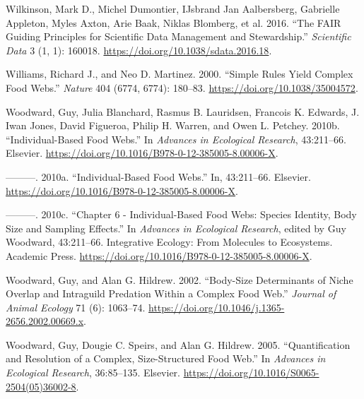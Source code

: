\documentclass{article}
\newlength{\cslhangindent}
\newlength{\cslentryspacingunit} %
\newenvironment{CSLReferences}[2] %
 {%
  \setlength{\parindent}{0pt}
  \ifodd #1
  \let\oldpar\par
  \def\par{\hangindent=\cslhangindent\oldpar}
  \fi
  \setlength{\parskip}{#2\cslentryspacingunit}
 }%
 {}
\begin{document}
\begin{CSLReferences}{1}{0}
\leavevmode{}%
Wilkinson, Mark D., Michel Dumontier, IJsbrand Jan Aalbersberg,
Gabrielle Appleton, Myles Axton, Arie Baak, Niklas Blomberg, et al.
2016. {``The {FAIR Guiding Principles} for Scientific Data Management
and Stewardship.''} \emph{Scientific Data} 3 (1, 1): 160018.
\url{https://doi.org/10.1038/sdata.2016.18}.

\leavevmode{}%
Williams, Richard J., and Neo D. Martinez. 2000. {``Simple Rules Yield
Complex Food Webs.''} \emph{Nature} 404 (6774, 6774): 180--83.
\url{https://doi.org/10.1038/35004572}.

\leavevmode{}%
Woodward, Guy, Julia Blanchard, Rasmus B. Lauridsen, Francois K.
Edwards, J. Iwan Jones, David Figueroa, Philip H. Warren, and Owen L.
Petchey. 2010b. {``Individual-{Based Food Webs}.''} In \emph{Advances in
{Ecological Research}}, 43:211--66. {Elsevier}.
\url{https://doi.org/10.1016/B978-0-12-385005-8.00006-X}.

\leavevmode{}%
---------. 2010a. {``Individual-Based Food Webs.''} In, 43:211--66.
Elsevier. \url{https://doi.org/10.1016/B978-0-12-385005-8.00006-X}.

\leavevmode{}%
---------. 2010c. {``Chapter 6 - {Individual}-{Based Food Webs}:
{Species Identity}, {Body Size} and {Sampling Effects}.''} In
\emph{Advances in {Ecological Research}}, edited by Guy Woodward,
43:211--66. Integrative {Ecology}: {From Molecules} to {Ecosystems}.
{Academic Press}.
\url{https://doi.org/10.1016/B978-0-12-385005-8.00006-X}.

\leavevmode{}%
Woodward, Guy, and Alan G. Hildrew. 2002. {``Body-Size Determinants of
Niche Overlap and Intraguild Predation Within a Complex Food Web.''}
\emph{Journal of Animal Ecology} 71 (6): 1063--74.
\url{https://doi.org/10.1046/j.1365-2656.2002.00669.x}.

\leavevmode{}%
Woodward, Guy, Dougie C. Speirs, and Alan G. Hildrew. 2005.
{``Quantification and {Resolution} of a {Complex}, {Size}-{Structured
Food Web}.''} In \emph{Advances in {Ecological Research}}, 36:85--135.
{Elsevier}. \url{https://doi.org/10.1016/S0065-2504(05)36002-8}.

\end{CSLReferences}



\end{document}
